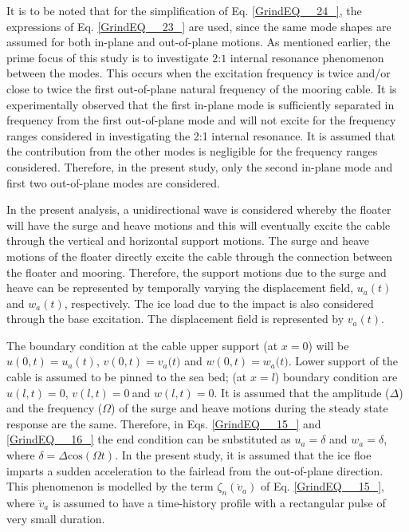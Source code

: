 \documentclass[review]{elsarticle}
\begin{document}
%
It is to be noted that for the simplification of Eq. \eqref{GrindEQ__24_}, the expressions of Eq. \eqref{GrindEQ__23_} are used, since the same mode shapes are assumed for both in-plane and out-of-plane motions.
%
As mentioned earlier, the prime focus of this study is to investigate $2$:$1$ internal resonance phenomenon between the modes. This occurs when the excitation frequency is twice and/or close to twice the first out-of-plane natural frequency of the mooring cable. It is experimentally observed that the first in-plane mode is sufficiently separated in frequency from the first out-of-plane mode and will not excite for the frequency ranges considered in investigating the 2:1 internal resonance. It is assumed that the contribution from the other modes is negligible for the frequency ranges considered. Therefore, in the present study, only the second in-plane mode and first two out-of-plane modes are considered. 

In the present analysis, a unidirectional wave is considered whereby the floater will have the surge and heave motions and this will eventually excite the cable through the vertical and horizontal support motions. The surge and heave motions of the floater directly excite the cable through the connection between the floater and mooring. Therefore, the support motions due to the surge and heave can be represented by temporally varying the displacement field, $u_{a}(t)$ and $w_{a}(t)$, respectively. The ice load due to the impact is also considered through the base excitation. The displacement field is represented by $v_{a}(t)$.

The boundary condition at the cable upper support (at $x=0$) will be $u\left(0,t\right)=u_a(t)$, $v\left(0,t\right)=v_a(t{)}$ and $w\left(0,t\right)=w_a(t{)}$. Lower support of the cable is assumed to be pinned to the sea bed; (at $x=l$) boundary condition are $u\left(l,t\right)=0$, $v\left(l,t\right)=0\ $and $w\left(l,t\right)=0$. It is assumed that the amplitude ($\Delta$) and the frequency ($\Omega$) of the surge and heave motions during the steady state response are the same. Therefore, in Eqs. \eqref{GrindEQ__15_} and \eqref{GrindEQ__16_} the end condition can be substituted as $u_a=\delta $ and $w_a=\delta $, where $\delta =\Delta \mathrm{cos} (\Omega t)$. In the present study, it is assumed that the ice floe imparts a sudden acceleration to the fairlead from the out-of-plane direction. This phenomenon is modelled by the term ${\zeta }_n\left({\ddot{v}}_a\right)$ of Eq. \eqref{GrindEQ__15_}, where ${\ddot{v}}_a$ is assumed to have a time-history profile with a rectangular pulse of very small duration.
\end{document}
